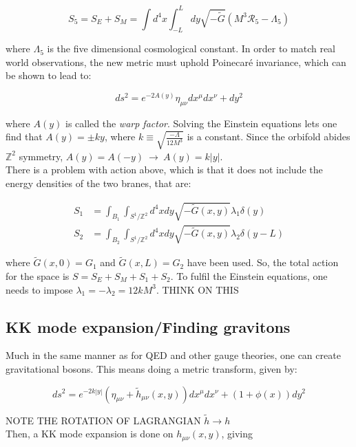 \documentclass[11pt,a4paper]{article}
\begin{document}
\begin{equation}
	S_5 = S_E + S_M = \int d^4x \int_{-L}^{L} dy \sqrt{-\tilde{G}}(M^3\mathcal{R}_5 - \Lambda_5)
\end{equation}

where $\Lambda_5$ is the five dimensional cosmological constant. In order to match real world observations, the new metric must uphold Poinecaré invariance, which can be shown to lead to:

\begin{equation}
	ds^2 = e^{-2A(y)}\eta_{\mu\nu}dx^\mu dx^\nu + dy^2
	\label{eq:RS_lineelement}
\end{equation}

where $A(y)$ is called the \emph{warp factor}. Solving the Einstein equations lets one find that $A(y) = \pm ky$, where $k \equiv \sqrt{\frac{-\Lambda}{12M^3}}$ is a constant. Since the orbifold abides $\mathbb{Z}^2$ symmetry, $A(y) = A(-y) \:\rightarrow\: A(y) = k|y|$.\\
There is a problem with action above, which is that it does not include the energy densities of the two branes, that are:

\begin{align}
	S_1 &= \int_{B_1}\int_{S^1/\mathbb{Z}^2}d^4xdy \sqrt{-\tilde{G}(x,y)}\lambda_1\delta(y)\\
	S_2 &= \int_{B_2}\int_{S^1/\mathbb{Z}^2}d^4xdy \sqrt{-\tilde{G}(x,y)}\lambda_2\delta(y-L)
\end{align}

where $\tilde{G}(x,0) = G_1$ and $\tilde{G}(x,L) = G_2$ have been used. So, the total action for the space is $S = S_E+S_M+S_1+S_2$. To fulfil the Einstein equations, one needs to impose $\lambda_1 = -\lambda_2 = 12kM^3$. THINK ON THIS

\subsection{KK mode expansion/Finding gravitons}
Much in the same manner as for QED and other gauge theories, one can create gravitational bosons. This means doing a metric transform, given by:

\begin{equation}
	ds^2 = e^{-2k|y|}(\eta_{\mu\nu} + \tilde{h}_{\mu\nu}(x,y))dx^\mu dx^\nu + (1+\phi(x))dy^2
\end{equation}

NOTE THE ROTATION OF LAGRANGIAN $\tilde{h}\rightarrow h$\\
Then, a KK mode expansion is done on $h_{\mu\nu}(x,y)$, giving
\end{document}
